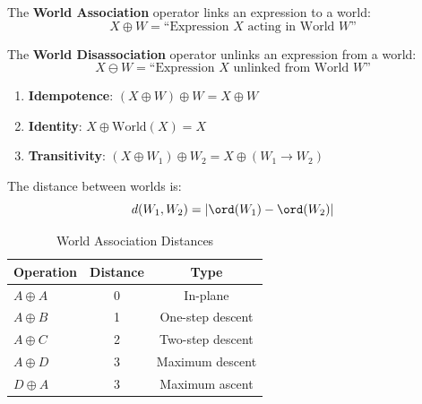\begin{definition}
\label{def:world-assoc}
The \textbf{World Association} operator links an expression to a world:
\[
X \oplus W = \text{``Expression } X \text{ acting in World } W\text{''}
\]
\end{definition}

\begin{definition}
\label{def:world-disassoc}
The \textbf{World Disassociation} operator unlinks an expression from a world:
\[
X \ominus W = \text{``Expression } X \text{ unlinked from World } W\text{''}
\]
\end{definition}

\begin{axiom}
\label{ax:assoc-laws}
\begin{enumerate}
  \item \textbf{Idempotence}: $(X \oplus W) \oplus W = X \oplus W$
  \item \textbf{Identity}: $X \oplus \mathrm{World}(X) = X$
  \item \textbf{Transitivity}: $(X \oplus W_1) \oplus W_2 = X \oplus (W_1 \to W_2)$
\end{enumerate}
\end{axiom}

\begin{definition}
\label{def:world-dist}
The distance between worlds is:
\[
d(W_1, W_2) = |\ord(W_1) - \ord(W_2)|
\]
\end{definition}

\begin{table}[h]
\centering
\caption{World Association Distances}
\label{tab:world-dist}
\begin{tabular}{lcc}
\toprule
\textbf{Operation} & \textbf{Distance} & \textbf{Type} \\
\midrule
$A \oplus A$ & 0 & In-plane \\
$A \oplus B$ & 1 & One-step descent \\
$A \oplus C$ & 2 & Two-step descent \\
$A \oplus D$ & 3 & Maximum descent \\
$D \oplus A$ & 3 & Maximum ascent \\
\bottomrule
\end{tabular}
\end{table}

